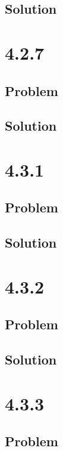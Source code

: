 \documentclass[12pt]{article}
\begin{document}
\subsection{Solution}

\newpage
\section{4.2.7}

\subsection{Problem}

\subsection{Solution}

\newpage
\section{4.3.1}

\subsection{Problem}

\subsection{Solution}

\newpage
\section{4.3.2}

\subsection{Problem}

\subsection{Solution}

\newpage
\section{4.3.3}

\subsection{Problem}
\end{document}
